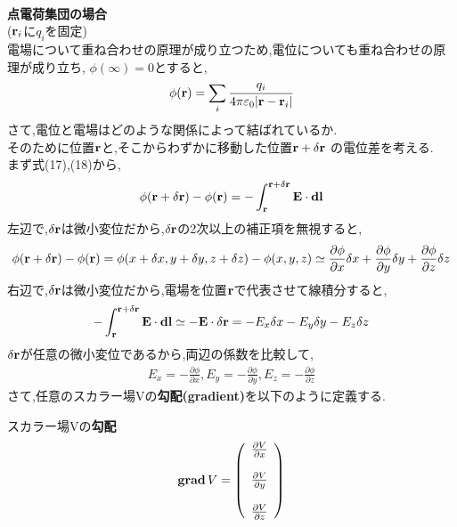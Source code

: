 \documentclass{jsarticle}
\begin{document}
\\
{\bf 点電荷集団の場合} \\
(${\bf r}_i$に$q_i$を固定) \\
電場について重ね合わせの原理が成り立つため,電位についても重ね合わせの原理が成り立ち, $\phi(\infty) = 0$とすると,
\begin{eqnarray}
\phi ({\bf r}) = \sum_i \frac{q_i}{4 \pi \varepsilon_0 |{\bf r}-{\bf r}_i|}
\end{eqnarray}
さて,電位と電場はどのような関係によって結ばれているか. \\
そのために位置${\bf r}$と,そこからわずかに移動した位置${\bf r}+{\bf \delta {\bf r}}$ の電位差を考える. \\
まず式(17),(18)から,
\begin{eqnarray}
\phi ({\bf r}+{\bf \delta {\bf r}}) - \phi({\bf r}) = - \int_{{\bf r}}^{{\bf r}+{\bf \delta {\bf r}}} {\bf E} \cdot {\bf dl}
\end{eqnarray}
左辺で,$\delta {\bf r}$は微小変位だから,${\bf \delta {\bf r}}$の2次以上の補正項を無視すると,
\begin{eqnarray}
\phi ({\bf r}+{\bf \delta {\bf r}}) - \phi({\bf r}) = \phi (x+ \delta x, y + \delta y, z + \delta z) - \phi(x,y,z) \simeq \frac{\partial \phi}{\partial x} \delta x + \frac{\partial \phi}{\partial y} \delta y + \frac{\partial \phi}{\partial z} \delta z
\end{eqnarray}
右辺で,$\delta {\bf r}$は微小変位だから,電場を位置${\bf r}$で代表させて線積分すると,
\begin{eqnarray}
- \int_{{\bf r}}^{{\bf r}+{\bf \delta {\bf r}}} {\bf E} \cdot {\bf dl} \simeq - {\bf E} \cdot {\bf \delta r} = - E_x \delta x - E_y \delta y - E_z \delta z
\end{eqnarray}
${\bf \delta r}$が任意の微小変位であるから,両辺の係数を比較して,
\begin{eqnarray}
E_x = - \frac{\partial \phi}{\partial x}, E_y = - \frac{\partial \phi}{\partial y}, E_z = - \frac{\partial \phi}{\partial z}
\end{eqnarray}
さて,任意のスカラー場Vの{\bf 勾配(gradient)}を以下のように定義する. \\
\begin{itembox}[c]{スカラー場Vの{\bf 勾配}}
\begin{eqnarray}
{\rm {\bf grad}}\,V =
\left(
\begin{array}{l}
\frac{\partial V}{\partial x} \\
\\
\frac{\partial V}{\partial y} \\
\\
\frac{\partial V}{\partial z}
\end{array}
\right)
\end{eqnarray}
\end{itembox}
\end{document}
